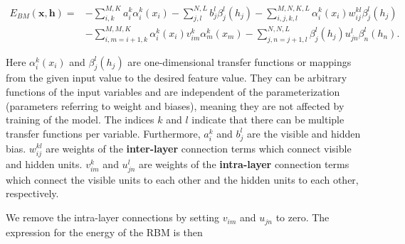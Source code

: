 \documentclass[%
oneside,                 %
final,                   %
10pt]{article}
\begin{document}
\begin{align}
	E_{BM}(\bm{x}, \bm{h}) =& - \sum_{i, k}^{M, K} a_i^k \alpha_i^k (x_i)
	- \sum_{j, l}^{N, L} b_j^l \beta_j^l (h_j) 
	- \sum_{i,j,k,l}^{M,N,K,L} \alpha_i^k (x_i) w_{ij}^{kl} \beta_j^l (h_j) \nonumber \\
	&- \sum_{i, m=i+1, k}^{M, M, K} \alpha_i^k (x_i) v_{im}^k \alpha_m^k (x_m)
	- \sum_{j,n=j+1,l}^{N,N,L} \beta_j^l (h_j) u_{jn}^l \beta_n^l (h_n).
\end{align}

Here $\alpha_i^k (x_i)$ and $\beta_j^l (h_j)$ are one-dimensional
transfer functions or mappings from the given input value to the
desired feature value. They can be arbitrary functions of the input
variables and are independent of the parameterization (parameters
referring to weight and biases), meaning they are not affected by
training of the model. The indices $k$ and $l$ indicate that there can
be multiple transfer functions per variable.  Furthermore, $a_i^k$ and
$b_j^l$ are the visible and hidden bias. $w_{ij}^{kl}$ are weights of
the \textbf{inter-layer} connection terms which connect visible and
hidden units. $ v_{im}^k$ and $u_{jn}^l$ are weights of the
\textbf{intra-layer} connection terms which connect the visible units
to each other and the hidden units to each other, respectively.

We remove the intra-layer connections by setting $v_{im}$ and $u_{jn}$
to zero. The expression for the energy of the RBM is then
\end{document}
